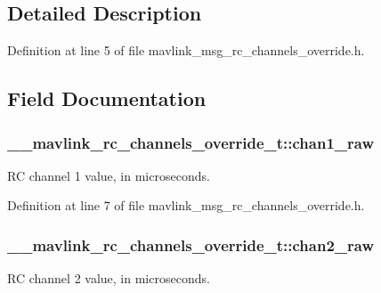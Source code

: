 \subsection{Detailed Description}


Definition at line 5 of file mavlink\-\_\-msg\-\_\-rc\-\_\-channels\-\_\-override.\-h.



\subsection{Field Documentation}
\hypertarget{struct____mavlink__rc__channels__override__t_aeb8348ef82cccce6d514fdf1d2a4d216}{
\subsubsection[{chan1\-\_\-raw}]{ \-\_\-\-\_\-mavlink\-\_\-rc\-\_\-channels\-\_\-override\-\_\-t\-::chan1\-\_\-raw}}\label{struct____mavlink__rc__channels__override__t_aeb8348ef82cccce6d514fdf1d2a4d216}


R\-C channel 1 value, in microseconds. 



Definition at line 7 of file mavlink\-\_\-msg\-\_\-rc\-\_\-channels\-\_\-override.\-h.

\hypertarget{struct____mavlink__rc__channels__override__t_ab3632a873125a666e50f889d854a41d4}{
\subsubsection[{chan2\-\_\-raw}]{ \-\_\-\-\_\-mavlink\-\_\-rc\-\_\-channels\-\_\-override\-\_\-t\-::chan2\-\_\-raw}}\label{struct____mavlink__rc__channels__override__t_ab3632a873125a666e50f889d854a41d4}


R\-C channel 2 value, in microseconds. 



